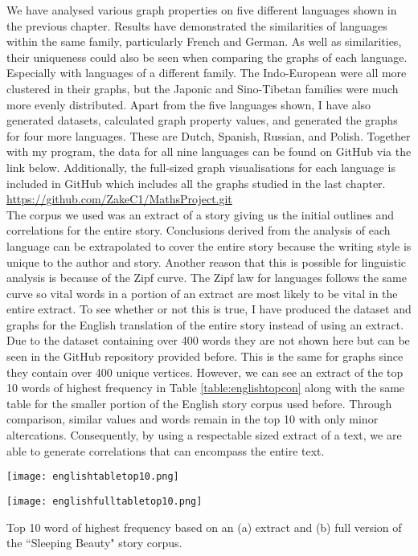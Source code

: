We have analysed various graph properties on five different languages shown in the previous chapter. Results have demonstrated the similarities of languages within the same family, particularly French and German. As well as similarities, their uniqueness could also be seen when comparing the graphs of each language. Especially with languages of a different family. The Indo-European were all more clustered in their graphs, but the Japonic and Sino-Tibetan families were much more evenly distributed. Apart from the five languages shown, I have also generated datasets, calculated graph property values, and generated the graphs for four more languages. These are Dutch, Spanish, Russian, and Polish. Together with my program, the data for all nine languages can be found on GitHub via the link below. Additionally, the full-sized graph visualisations for each language is included in GitHub which includes all the graphs studied in the last chapter.\\

\url{https://github.com/ZakeC1/MathsProject.git}\\

The corpus we used was an extract of a story giving us the initial outlines and correlations for the entire story. Conclusions derived from the analysis of each language can be extrapolated to cover the entire story because the writing style is unique to the author and story. Another reason that this is possible for linguistic analysis is because of the Zipf curve. The Zipf law for languages follows the same curve so vital words in a portion of an extract are most likely to be vital in the entire extract. To see whether or not this is true, I have produced the dataset and graphs for the English translation of the entire story instead of using an extract. Due to the dataset containing over 400 words they are not shown here but can be seen in the GitHub repository provided before. This is the same for graphs since they contain over 400 unique vertices. However, we can see an extract of the top 10 words of highest frequency in Table \ref{table:englishtopcon} along with the same table for the smaller portion of the English story corpus used before. Through comparison, similar values and words remain in the top 10 with only minor altercations. Consequently, by using a respectable sized extract of a text, we are able to generate correlations that can encompass the entire text.

\begin{table}[!htb]
\centering
\begin{subtable}{.45\textwidth}
	\centering
	\texttt{[image: englishtabletop10.png]}
	\caption{}
\end{subtable}
\hfill
\begin{subtable}{.45\textwidth}
	\centering
	\texttt{[image: englishfulltabletop10.png]}
	\caption{}
\end{subtable}
\caption{Top 10 word of highest frequency based on an (a) extract and (b) full version of the ``Sleeping Beauty" story corpus.}
\label{table:englishtopcon}
\end{table}

